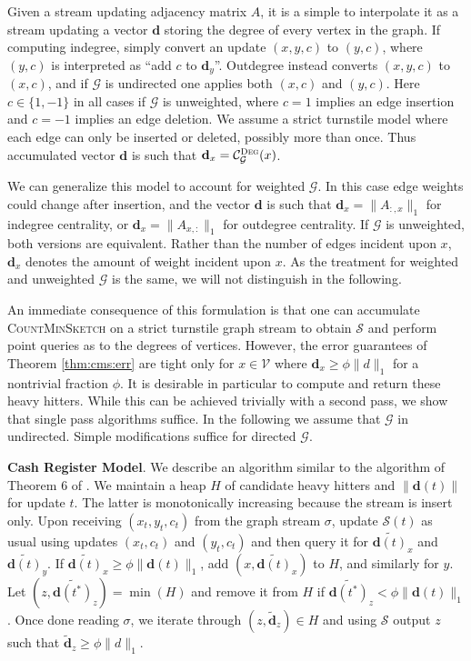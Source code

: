 \documentclass[10]{report}
\newcommand{\algoname}[1]{\textnormal{\textsc{#1}}}
\begin{document}
Given a stream updating adjacency matrix $A$, it is a simple to interpolate it as a stream updating a vector $\mathbf{d}$ storing the degree of every vertex in the graph. 
If computing indegree, simply convert an update $(x,y,c)$ to $(y,c)$, where $(y,c)$ is interpreted as ``add $c$ to $\mathbf{d}_y$''. 
Outdegree instead converts $(x,y,c)$ to $(x,c)$, and if $\mathcal{G}$ is undirected one applies both $(x,c)$ and $(y,c)$. 
Here $c \in \{1, -1\}$ in all cases if $\mathcal{G}$ is unweighted, where $c=1$ implies an edge insertion and $c=-1$ implies an edge deletion.
We assume a strict turnstile model where each edge can only be inserted or deleted, possibly more than once.
Thus accumulated vector $\mathbf{d}$ is such that $\mathbf{d}_x = \mathcal{C}^{\algoname{Deg}}_{\mathcal{G}}(x)$.

We can generalize this model to account for weighted $\mathcal{G}$.
In this case edge weights could change after insertion, and the vector $\mathbf{d}$ is such that $\mathbf{d}_x = \|A_{:,x}\|_1$ for indegree centrality, or $\mathbf{d}_x = \|A_{x,:}\|_1$ for outdegree centrality.
If $\mathcal{G}$ is unweighted, both versions are equivalent.
Rather than the number of edges incident upon $x$, $\mathbf{d}_x$ denotes the amount of weight incident upon $x$. 
As the treatment for weighted and unweighted $\mathcal{G}$ is the same, we will not distinguish in the following. 

An immediate consequence of this formulation is that one can accumulate \algoname{CountMinSketch} on a strict turnstile graph stream to obtain $\mathcal{S}$ and perform point queries as to the degrees of vertices.
However, the error guarantees of Theorem \ref{thm:cms:err} are tight only for $x \in \mathcal{V}$ where $\mathbf{d}_x \geq \phi \|d\|_1$ for a nontrivial fraction $\phi$.
It is desirable in particular to compute and return these heavy hitters.
While this can be achieved trivially with a second pass, we show that single pass algorithms suffice.
In the following we assume that $\mathcal{G}$ in undirected. 
Simple modifications suffice for directed $\mathcal{G}$.

\textbf{Cash Register Model}.
We describe an algorithm similar to the algorithm of Theorem 6 of \cite{cormode2005improved}.
We maintain a heap $H$ of candidate heavy hitters and $\|\mathbf{d}(t)\|$ for update $t$.
The latter is monotonically increasing because the stream is insert only. 
Upon receiving $(x_t, y_t, c_t)$ from the graph stream $\sigma$, update $\mathcal{S}(t)$ as usual using updates $(x_t, c_t)$ and $(y_t, c_t)$ and then query it for $\widetilde{\mathbf{d}(t)}_x$ and $\widetilde{\mathbf{d}(t)}_y$.
If $\widetilde{\mathbf{d}(t)}_x \geq \phi\|\mathbf{d}(t)\|_1$, add $\left ( x, \widetilde{\mathbf{d}(t)}_x \right )$ to $H$, and similarly for $y$.
Let $\left ( z, \widetilde{\mathbf{d}(t^*)}_z \right ) = \min (H)$ and remove it from $H$ if $\widetilde{\mathbf{d}(t^*)}_z < \phi \|\mathbf{d}(t)\|_1$.
Once done reading $\sigma$, we iterate through $\left ( z, \widetilde{\mathbf{d}}_z \right ) \in H$ and using $\mathcal{S}$ output $z$ such that $\widetilde{\mathbf{d}}_z \geq \phi \|d\|_1$.
\end{document}

